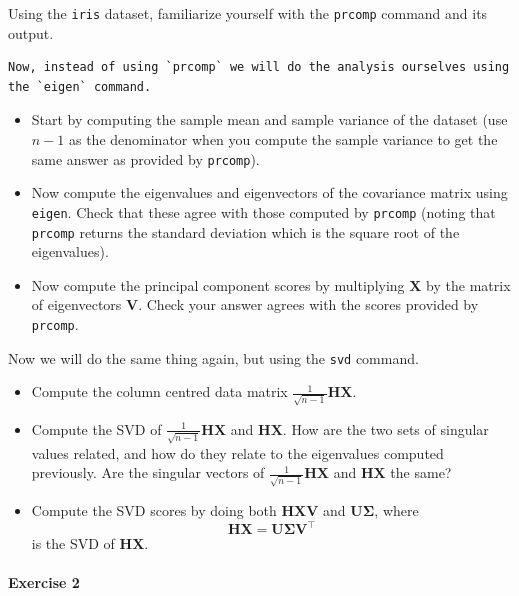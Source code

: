 \documentclass[]{book}
\providecommand{\tightlist}{%
  \setlength{\itemsep}{0pt}\setlength{\parskip}{0pt}}
\let\oldparagraph\paragraph
\renewcommand{\paragraph}[1]{\oldparagraph{#1}\mbox{}}
\theoremstyle{definition}
\theoremstyle{definition}
\theoremstyle{definition}
\theoremstyle{remark}
\begin{document}
Using the \texttt{iris} dataset, familiarize yourself with the \texttt{prcomp} command and its output.

\begin{verbatim}
Now, instead of using `prcomp` we will do the analysis ourselves using the `eigen` command. 
\end{verbatim}

\begin{itemize}
\tightlist
\item
  Start by computing the sample mean and sample variance of the dataset (use \(n-1\) as the denominator when you compute the sample variance to get the same answer as provided by \texttt{prcomp}).
\item
  Now compute the eigenvalues and eigenvectors of the covariance matrix using \texttt{eigen}. Check that these agree with those computed by \texttt{prcomp} (noting that \texttt{prcomp} returns the standard deviation which is the square root of the eigenvalues).
\item
  Now compute the principal component scores by multiplying \(\mathbf X\) by the matrix of eigenvectors \(\mathbf V\). Check your answer agrees with the scores provided by \texttt{prcomp}.
\end{itemize}

Now we will do the same thing again, but using the \texttt{svd} command.

\begin{itemize}
\item
  Compute the column centred data matrix \(\frac{1}{\sqrt{n-1}}\mathbf H\mathbf X\).
\item
  Compute the SVD of \(\frac{1}{\sqrt{n-1}}\mathbf H\mathbf X\) and \(\mathbf H\mathbf X\). How are the two sets of singular values related, and how do they relate to the eigenvalues computed previously.
  Are the singular vectors of \(\frac{1}{\sqrt{n-1}}\mathbf H\mathbf X\) and \(\mathbf H\mathbf X\) the same?
\item
  Compute the SVD scores by doing both \(\mathbf H\mathbf X\mathbf V\) and \(\mathbf U\boldsymbol{\Sigma}\), where
  \[\mathbf H\mathbf X= \mathbf U\boldsymbol{\Sigma}\mathbf V^\top\]
  is the SVD of \(\mathbf H\mathbf X\).
\end{itemize}

\hypertarget{exercise-2}{%
\paragraph{Exercise 2}\label{exercise-2}}
\end{document}

